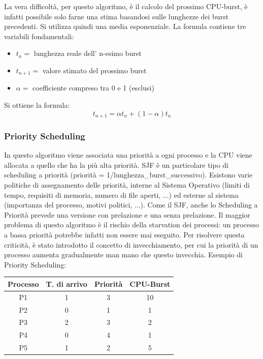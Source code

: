 \documentclass[a4paper]{article}
\begin{document}
\newpage

La vera difficoltà, per questo algoritmo, è il calcolo del prossimo CPU-burst, è infatti possibile solo farne una stima basandosi sulle lunghezze dei burst precedenti. Si utilizza quindi una media esponenziale. La formula contiene tre variabili fondamentali:
\begin{itemize}
   \item $t_n =$ lunghezza reale dell' n-esimo burst
   \item $t_{n+1} =$ valore stimato del prossimo burst
   \item $\alpha =$ coefficiente compreso tra 0 e 1 (esclusi)
\end{itemize}
Si ottiene la formula: \newline
$$
   t_{n+1} = \alpha t_n + (1 - \alpha)t_{n}
$$

\subsubsection{Priority Scheduling}
In questo algoritmo viene associata una priorità a ogni processo e la CPU viene allocata a quello che ha la più alta priorità. SJF è un particolare tipo di scheduling a priorità (priorità = 1/lunghezza\_burst\_successivo). \newline
Esistono varie politiche di assegnamento delle priorità, interne al Sistema Operativo (limiti di tempo, requisiti di memoria, numero di file aperti, ...) ed esterne al sistema (importanza del processo, motivi politici, ...). Come il SJF, anche lo Scheduling a Priorità prevede una versione con prelazione e una senza prelazione.\newline
Il maggior problema di questo algoritmo è il rischio della starvation dei processi: un processo a bassa priorità potrebbe infatti non essere mai eseguito. Per risolvere questa criticità, è stato introdotto il concetto di invecchiamento, per cui la priorità di un processo aumenta gradualmente man mano che questo invecchia. \newline
Esempio di Priority Scheduling:

\begin{table}[htb]
   \centering
   \label{my-label}
   \begin{tabular}{|c|c|c|c|}
      \hline
      Processo & T. di arrivo & Priorità & CPU-Burst \\ \hline
      P1       & 1            & 3        & 10        \\ \hline
      P2       & 0            & 1        & 1         \\ \hline
      P3       & 2            & 3        & 2         \\ \hline
      P4       & 0            & 4        & 1         \\ \hline
      P5       & 1            & 2        & 5         \\ \hline
   \end{tabular}
\end{table}
\end{document}
